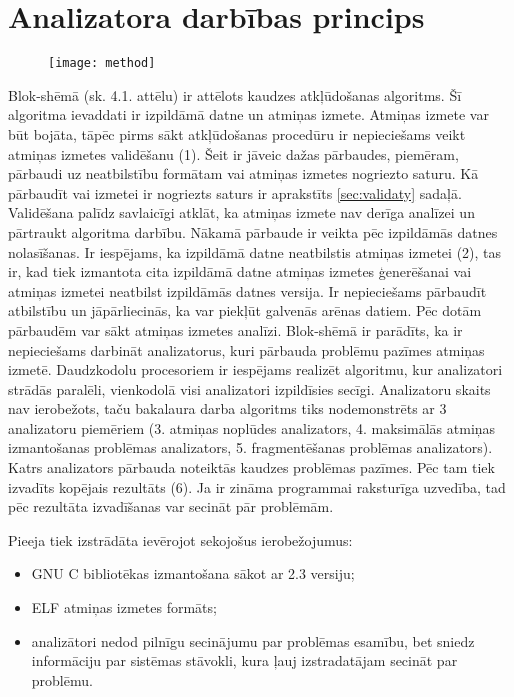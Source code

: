﻿\section{Analizatora darbības princips}

 \begin{figure}[h]
\begin{center}
\texttt{[image: method]}
\end{center}
\caption{\textbf{\fontsize{11}{12}\selectfont {Uz metodi balstītā algoritma blok-shēma}}}
\end{figure}

Blok-shēmā (sk. 4.1. attēlu) ir attēlots kaudzes atkļūdošanas algoritms.
Šī algoritma ievaddati ir izpildāmā datne un atmiņas izmete.
Atmiņas izmete var būt bojāta, tāpēc pirms sākt atkļūdošanas procedūru ir nepieciešams veikt atmiņas izmetes validēšanu (1).
Šeit ir jāveic dažas pārbaudes, piemēram, pārbaudi uz neatbilstību formātam vai atmiņas izmetes nogriezto saturu.
Kā pārbaudīt vai izmetei ir nogriezts saturs ir aprakstīts \ref{sec:validaty} sadaļā.
Validēšana palīdz savlaicīgi atklāt, ka atmiņas izmete nav derīga analīzei un pārtraukt algoritma darbību.
Nākamā pārbaude ir veikta pēc izpildāmās datnes nolasīšanas.
Ir iespējams, ka izpildāmā datne neatbilstis atmiņas izmetei (2), tas ir, kad tiek izmantota cita izpildāmā datne atmiņas izmetes ģenerēšanai vai atmiņas izmetei neatbilst izpildāmās datnes versija.
Ir nepieciešams pārbaudīt atbilstību un jāpārliecinās, ka var piekļūt galvenās arēnas datiem.
Pēc dotām pārbaudēm var sākt atmiņas izmetes analīzi.
Blok-shēmā ir parādīts, ka ir nepieciešams darbināt analizatorus, kuri  pārbauda problēmu pazīmes atmiņas izmetē.
Daudzkodolu procesoriem ir iespējams realizēt algoritmu, kur analizatori strādās paralēli, vienkodolā visi analizatori izpildīsies secīgi.
Analizatoru skaits nav ierobežots, taču bakalaura darba algoritms tiks nodemonstrēts ar 3 analizatoru piemēriem (3. atmiņas noplūdes analizators, 4. maksimālās atmiņas izmantošanas problēmas analizators, 5. fragmentēšanas problēmas analizators).
Katrs analizators pārbauda noteiktās kaudzes problēmas pazīmes.
Pēc tam tiek izvadīts kopējais rezultāts (6).
Ja ir zināma programmai raksturīga uzvedība, tad pēc rezultāta izvadīšanas var secināt pār problēmām.

Pieeja tiek izstrādāta ievērojot sekojošus ierobežojumus: %
\begin{itemize}
	\item GNU C bibliotēkas izmantošana sākot ar 2.3 versiju;
    \item ELF atmiņas izmetes formāts;
    \item analizātori nedod pilnīgu secinājumu par problēmas esamību, bet sniedz informāciju par sistēmas stāvokli, kura ļauj izstradatājam secināt par problēmu.
\end{itemize}



